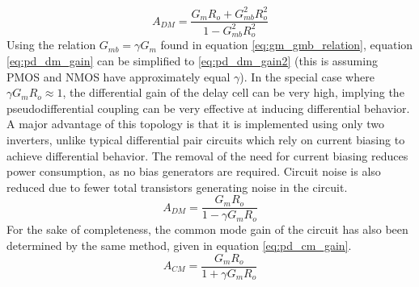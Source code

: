 			\begin{equation}\label{eq:pd_dm_gain}
				A_{DM} = \frac{G_mR_o + G_{mb}^2R_o^2}{1 - G_{mb}^2R_o^2}
			\end{equation}
			Using the relation $G_{mb} = \gamma G_{m}$ found in equation \ref{eq:gm_gmb_relation}, equation \ref{eq:pd_dm_gain} can be simplified to \ref{eq:pd_dm_gain2} (this is assuming PMOS and NMOS have approximately equal $\gamma$). In the special case where $\gamma G_mR_o \approx 1$, the differential gain of the delay cell can be very high, implying the pseudodifferential coupling can be very effective at inducing differential behavior. A major advantage of this topology is that it is implemented using only two inverters, unlike typical differential pair circuits which rely on current biasing to achieve differential behavior. The removal of the need for current biasing reduces power consumption, as no bias generators are required. Circuit noise is also reduced due to fewer total transistors generating noise in the circuit.
			\begin{equation}\label{eq:pd_dm_gain2}
				A_{DM} = \frac{G_mR_o }{1 - \gamma G_mR_o }
			\end{equation}
			For the sake of completeness, the common mode gain of the circuit has also been determined by the same method, given in equation \ref{eq:pd_cm_gain}.
			\begin{equation}\label{eq:pd_cm_gain}
				A_{CM} = \frac{G_mR_o }{1 + \gamma G_mR_o }
			\end{equation}


